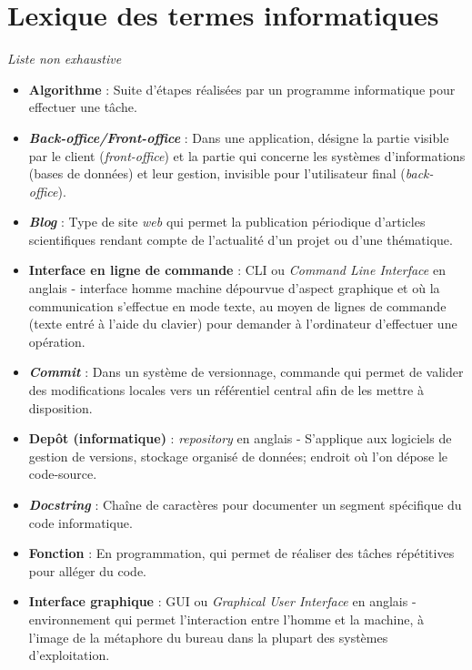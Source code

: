\chapter*{Lexique des termes informatiques}

\textit{\small{Liste non exhaustive}}

\begin{itemize}
    \item \textbf{Algorithme} : Suite d'étapes réalisées par un programme informatique pour effectuer une tâche.
    \item \textbf{\textit{Back-office/Front-office}} : Dans une application, désigne la partie visible par le client (\textit{front-office}) et la partie qui concerne les systèmes d'informations (bases de données) et leur gestion, invisible pour l'utilisateur final (\textit{back-office}).
    \item \textbf{\textit{Blog}} : Type de site \textit{web} qui permet la publication périodique d'articles scientifiques rendant compte de l'actualité d'un projet ou d'une thématique.
    \item \textbf{Interface en ligne de commande} : CLI ou \textit{Command Line Interface} en anglais - interface homme machine dépourvue d'aspect graphique et où la communication s'effectue en mode texte, au moyen de lignes de commande (texte entré à l'aide du clavier) pour demander à l'ordinateur d'effectuer une opération.
    \item \textbf{\textit{Commit}} : Dans un système de versionnage, commande qui permet de valider des modifications locales vers un référentiel central afin de les mettre à disposition.
    \item \textbf{Depôt (informatique)} : \textit{repository} en anglais -  S'applique aux logiciels de gestion de versions, stockage organisé de données; endroit où l'on dépose le code-source.
    \item \textbf{\textit{Docstring}} : Chaîne de caractères pour documenter un segment spécifique du code informatique.
    \item \textbf{Fonction} : En programmation,  qui permet de réaliser des tâches répétitives pour alléger du code.
    \item \textbf{Interface graphique} : GUI ou \textit{Graphical User Interface} en anglais - environnement qui permet l'interaction entre l'homme et la machine, à l'image de la métaphore du bureau dans la plupart des systèmes d'exploitation.

\end{itemize}

